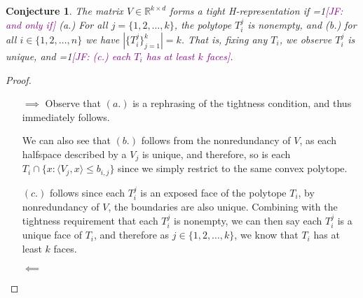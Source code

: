 \documentclass[12pt]{article}
\newcommand{\Comments}{1}
\newcommand{\mynote}[2]{\ifnum\Comments=1\textcolor{#1}{#2}\fi}
\newcommand{\jessie}[1]{\mynote{purple}{[JF: #1]}}
\newcommand{\reals}{\mathbb{R}}
\newcommand{\inprod}[2]{\langle #1, #2 \rangle}
\newtheorem{conjecture}{Conjecture}
\begin{document}
\begin{conjecture}
	The matrix $V \in \reals^{k \times d}$ forms a tight H-representation if \jessie{and only if} (a.) For all $j = \{1,2,\ldots, k\}$, the polytope $T_i^j$ is nonempty, and (b.) for all $i \in \{1,2,\ldots, n\}$ we have $|\{T_i^j\}_{j=1}^k| = k$.  That is, fixing any $T_i$, we observe $T_i^j$ is unique, and \jessie{(c.) each $T_i$ has at least $k$ faces}.
\end{conjecture}
\begin{proof}
	
	\begin{itemize}
		\item [$\implies$]
		Observe that $(a.)$ is a rephrasing of the tightness condition, and thus immediately follows.
		
		We can also see that $(b.)$ follows from the nonredundancy of $V$, as each halfspace described by a $V_j$ is unique, and therefore, so is each $T_i \cap \{x : \inprod{V_j}{x} \leq b_{i,j} \}$ since we simply restrict to the same convex polytope.
		
		$(c.)$ follows since each $T_i^j$ is an exposed face of the polytope $T_i$, by nonredundancy of $V$, the boundaries are also unique.
		Combining with the tightness requirement that each $T_i^j$ is nonempty, we can then say each $T_i^j$ is a unique face of $T_i$, and therefore as $j \in \{1,2, \ldots, k\}$, we know that $T_i$ has at least $k$ faces.
		
		
		
		\item [$\impliedby$]
	\end{itemize}
\end{proof}
\end{document}
